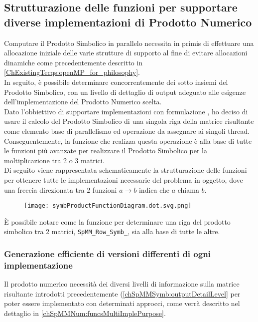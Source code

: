 \subsection{Strutturazione delle funzioni per supportare diverse implementazioni di Prodotto Numerico}
Computare il Prodotto Simbolico in parallelo necessita in primis di effettuare una 
allocazione iniziale delle varie strutture di supporto al fine di evitare allocazioni dinamiche
come precedentemente descritto in \ref{ChExistingTecqs:openMP_for_philosophy}.\\
In seguito, è possibile determinare concorrentemente dei sotto insiemi del Prodotto Simbolico, con un
livello di dettaglio di output adeguato alle esigenze dell'implementazione del Prodotto Numerico scelta.\\
Dato l'obbiettivo di supportare implementazioni con formulazione \rowbyrow, ho deciso di usare 
il calcolo del Prodotto Simbolico di una singola riga della matrice risultante 
come elemento base di parallelismo ed operazione da assegnare ai singoli thread.\\
\label{chSpMMSymb:accurateBaseBlock}	%
Conseguentemente, la funzione che realizza questa operazione è alla base di tutte le funzioni
più avanzate per realizzare il Prodotto Simbolico per la moltiplicazione tra 2 o 3 matrici.\\

Di seguito viene rappresentata schematicamente la strutturazione delle funzioni per ottenere tutte le implementazioni
necessarie del problema in oggetto, dove una freccia direzionata tra 2 funzioni $a \rightarrow b$ indica che $a$ chiama $b$.\\
\begin{figure}[h!]
  \caption[Rappresentazione schematica delle dipendenze delle funzioni appartenenti al modulo del Prodotto Simbolico]
  \centering \texttt{[image: symbProductFunctionDiagram.dot.svg.png]} \decoRule
  \label{figCode:symbProductFunctionDiagram}
\end{figure}
\label{SpMM_Row_Symb_}
È possibile notare come la funzione per determinare una riga del prodotto simbolico tra 2 matrici,
\verb|SpMM_Row_Symb_|, sia alla base di tutte le altre.\\ %

\subsubsection{Generazione efficiente di versioni differenti di ogni implementazione}
Il prodotto numerico necessità dei diversi livelli di informazione sulla matrice risultante 
introdotti precedentemente (\ref{chSpMMSymb:outputDetailLevel}
per poter essere implementato con determinati approcci, come verrà descritto nel dettaglio in \ref{chSpMMNum:funcsMultiImplePurpose}.\\

